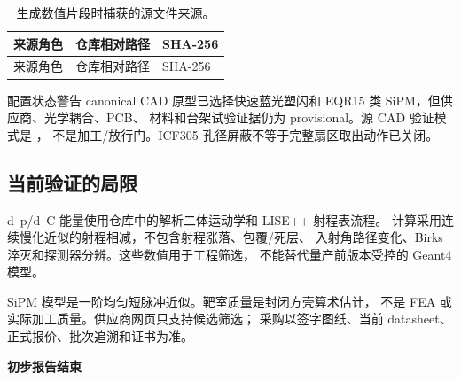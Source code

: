 \documentclass[UTF8,10pt,letterpaper,fontset=none]{ctexart}
\begin{document}
\begin{longtable}{L{0.18\textwidth}L{0.47\textwidth}L{0.27\textwidth}}
  \caption{生成数值片段时捕获的源文件来源。}\\
  \toprule
  来源角色 & 仓库相对路径 & SHA-256 \\
  \midrule
  \endfirsthead
  \toprule
  来源角色 & 仓库相对路径 & SHA-256 \\
  \midrule
  \endhead
  
\end{longtable}

\begin{notebox}{配置状态警告}
  canonical CAD 原型已选择快速蓝光塑闪和 EQR15 类 SiPM，但供应商、光学耦合、PCB、
  材料和台架试验证据仍为 provisional。源 CAD 验证模式是 \SourceValidationMode，
  不是加工/放行门。ICF305 孔径屏蔽不等于完整扇区取出动作已关闭。
\end{notebox}

\subsection{当前验证的局限}

d--p/d--C 能量使用仓库中的解析二体运动学和 LISE++ 射程表流程。
计算采用连续慢化近似的射程相减，不包含射程涨落、包覆/死层、
入射角路径变化、Birks 淬灭和探测器分辨。这些数值用于工程筛选，
不能替代量产前版本受控的 Geant4 模型。

SiPM 模型是一阶均匀短脉冲近似。靶室质量是封闭方壳算术估计，
不是 FEA 或实际加工质量。供应商网页只支持候选筛选；
采购以签字图纸、当前 datasheet、正式报价、批次追溯和证书为准。

\clearpage
\nocite{polarimeter_repo}
\printbibliography[title={参考文献与供应商证据}]

\vfill
\begin{center}
  {\sffamily\small\bfseries\color{ReportMuted} 初步报告结束}
\end{center}
\end{document}
